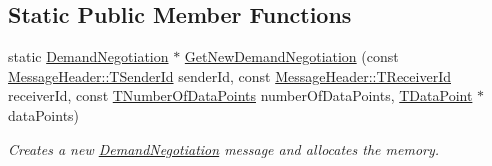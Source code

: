 \subsection*{Static Public Member Functions}
\begin{DoxyCompactItemize}
\item 
static \hyperlink{class_terra_swarm_1_1_synchronous_1_1_demand_negotiation}{Demand\-Negotiation} $\ast$ \hyperlink{class_terra_swarm_1_1_synchronous_1_1_demand_negotiation_a99ffac24b0af7f388d29eb47d3c19f33}{Get\-New\-Demand\-Negotiation} (const \hyperlink{class_terra_swarm_1_1_message_header_a516b36855e2aad7cfbf8770f1b42784f}{Message\-Header\-::\-T\-Sender\-Id} sender\-Id, const \hyperlink{class_terra_swarm_1_1_message_header_aa3260702b182b6f88ddbdd3416e98df0}{Message\-Header\-::\-T\-Receiver\-Id} receiver\-Id, const \hyperlink{class_terra_swarm_1_1_synchronous_1_1_demand_negotiation_aeaaae7fc1861d9af2bff4c9dcb4d89ac}{T\-Number\-Of\-Data\-Points} number\-Of\-Data\-Points, \hyperlink{class_terra_swarm_1_1_synchronous_1_1_demand_negotiation_a6660353fa0a65775070bba8571a76e3d}{T\-Data\-Point} $\ast$data\-Points)
\begin{DoxyCompactList}\small\item\em Creates a new \hyperlink{class_terra_swarm_1_1_synchronous_1_1_demand_negotiation}{Demand\-Negotiation} message and allocates the memory. \end{DoxyCompactList}\end{DoxyCompactItemize}
